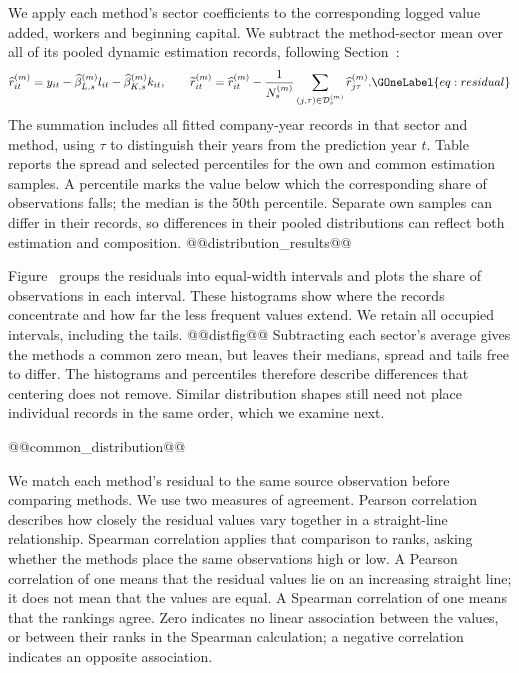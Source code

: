 We apply each method's sector coefficients to the corresponding logged value added, workers and beginning capital. We subtract the method-sector mean over all of its pooled dynamic estimation records, following Section~:
\begin{equation}
\widehat r_{it}^{(m)}=y_{it}-\widehat\beta_{L,s}^{(m)}l_{it}-\widehat\beta_{K,s}^{(m)}k_{it},\qquad
\widetilde r_{it}^{(m)}=\widehat r_{it}^{(m)}-\frac{1}{N_s^{(m)}}\sum_{(j,\tau)\in\mathcal D_s^{(m)}}\widehat r_{j\tau}^{(m)}.
\GOneLabel{eq:residual}
\end{equation}
The summation includes all fitted company-year records in that sector and method, using $\tau$ to distinguish their years from the prediction year $t$. Table~ reports the spread and selected percentiles for the own and common estimation samples. A percentile marks the value below which the corresponding share of observations falls; the median is the 50th percentile. Separate own samples can differ in their records, so differences in their pooled distributions can reflect both estimation and composition.
@@distribution_results@@

Figure~ groups the residuals into equal-width intervals and plots the share of observations in each interval. These histograms show where the records concentrate and how far the less frequent values extend. We retain all occupied intervals, including the tails.
@@distfig@@
Subtracting each sector's average gives the methods a common zero mean, but leaves their medians, spread and tails free to differ. The histograms and percentiles therefore describe differences that centering does not remove. Similar distribution shapes still need not place individual records in the same order, which we examine next.

@@common_distribution@@

We match each method's residual to the same source observation before comparing methods. We use two measures of agreement. Pearson correlation describes how closely the residual values vary together in a straight-line relationship. Spearman correlation applies that comparison to ranks, asking whether the methods place the same observations high or low. A Pearson correlation of one means that the residual values lie on an increasing straight line; it does not mean that the values are equal. A Spearman correlation of one means that the rankings agree. Zero indicates no linear association between the values, or between their ranks in the Spearman calculation; a negative correlation indicates an opposite association.

